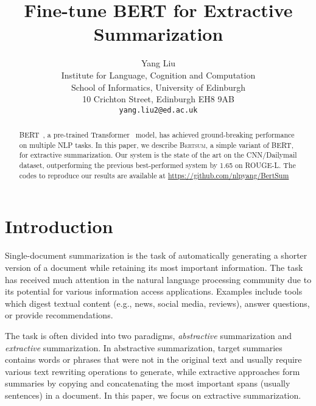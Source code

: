 \documentclass[11pt,a4paper]{article}
\title{ Fine-tune BERT for Extractive Summarization }
\author{Yang Liu \\
    Institute for Language, Cognition and Computation
    \\
    School of Informatics, University of Edinburgh
    \\ 
    10 Crichton Street, Edinburgh EH8 9AB \\
    {\tt yang.liu2@ed.ac.uk}
}
\date{}
\begin{document}
    \maketitle
    \begin{abstract}
                \DeclareUrlCommand{\url}{\def\UrlFont{\color{blue}\normalfont}}


BERT~\citep{devlin2018bert}, a pre-trained Transformer~\citep{vaswani2017attention} model,  has achieved ground-breaking performance on multiple NLP tasks.
In
this paper, we describe \textsc{Bertsum}, a  simple variant of BERT, for extractive summarization. Our system is the state of the art on the CNN/Dailymail dataset, outperforming the previous best-performed system by 1.65 on ROUGE-L. The codes
to reproduce our results are available at \url{https://github.com/nlpyang/BertSum}

\DeclareUrlCommand{\url}{\def\UrlFont{\color{magenta}\normalfont}}
        
        
        
        
        
    \end{abstract}
    
    \section{Introduction}
    
    Single-document summarization is the task of automatically generating
    a shorter version of a document while retaining its most important
    information.  The task has received much attention in the natural
    language processing community due to its potential for various
    information access applications. Examples include tools which digest
    textual content (e.g., news, social media,  reviews), answer
    questions, or provide recommendations.
    
    The task is often divided into two paradigms, \textit{abstractive}
    summarization and \textit{extractive}    summarization.
        In abstractive
    summarization, target summaries contains words or phrases that were not in the original text and usually require various text rewriting operations to generate, while extractive approaches
    form summaries by
    copying and concatenating the most important spans (usually
    sentences) in a document.  In this paper, we focus on extractive summarization.
    
\end{document}
